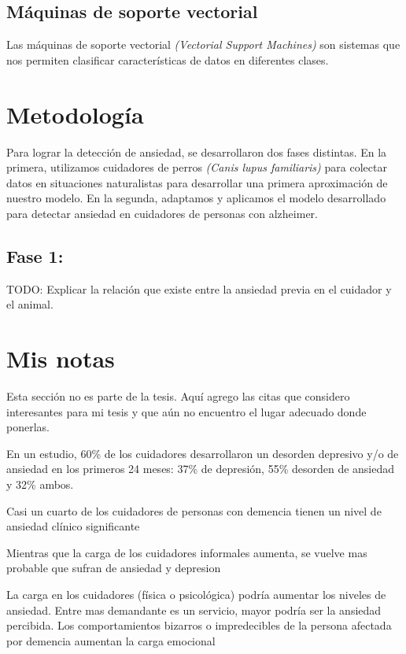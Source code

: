 \documentclass[letterpaper,12pt]{cicese}
\begin{document}
		\section{M\'aquinas de soporte vectorial}
			Las m\'aquinas de soporte vectorial \textit{(Vectorial Support Machines)} son sistemas que nos permiten clasificar caracter\'isticas de datos en diferentes clases.
		
	\newpage
		\chapter{Metodolog\'ia}
		Para lograr la detecci\'on de ansiedad, se desarrollaron dos fases distintas. En la primera, utilizamos cuidadores de perros \textit{(Canis lupus familiaris)} para colectar datos en situaciones naturalistas para desarrollar una primera aproximaci\'on de nuestro modelo. En la segunda, adaptamos y aplicamos el modelo desarrollado para detectar ansiedad en cuidadores de personas con alzheimer.
		\section{Fase 1:} 
			TODO: Explicar la relaci\'on que existe entre la ansiedad previa en el cuidador y el animal.
			
	\newpage
		\chapter{Mis notas}
			Esta secci\'on no es parte de la tesis. Aqu\'i agrego las citas que considero interesantes para mi tesis y que a\'un no encuentro el lugar adecuado donde ponerlas.

	
	
		En un estudio, 60\% de los cuidadores desarrollaron un desorden depresivo y/o de ansiedad en los primeros 24 meses: 37\% de depresi\'on, 55\% desorden de ansiedad y 32\% ambos. \citep{Joling2014}

		Casi un cuarto de los cuidadores de personas con demencia tienen un nivel de ansiedad cl\'inico significante \citep{Cooper200615}

		Mientras que la carga de los cuidadores informales aumenta, se vuelve mas probable que sufran de ansiedad y depresion \citep{Denno20131731}

		La carga en los cuidadores (f\'isica o psicol\'ogica) podr\'ia aumentar los niveles de ansiedad. Entre mas demandante es un servicio, mayor podr\'ia ser la ansiedad percibida. Los comportamientos bizarros o impredecibles de la persona afectada por demencia aumentan la carga emocional \citep{Rosa201054}
\end{document}
